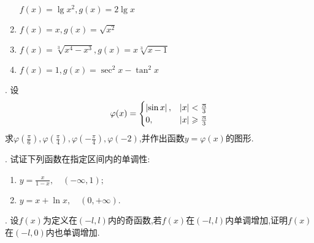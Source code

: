 \begin{task}{}
\begin{enumerate}
    $f(x)=\lg{x^2},g(x)=2\lg{x}$
  \item
    $f(x)=x,g(x)=\sqrt{x^2}$
  \item
    $f(x)=\sqrt[3]{x^{4}-x^{3}},g(x)=x\sqrt[3]{x-1}$
  \item
    $f(x)=1,g(x)=\sec^2{x}-\tan^2{x}$
  \end{enumerate}
  . 设
  \begin{align*}
    \varphi(x)=
    \begin{cases}
      \left|\sin x\right|,&\left|x\right|<\frac{\uppi}{3}\\
      0,&\left|x\right|\geqslant\frac{\uppi}{3}
    \end{cases}
  \end{align*}
  求$\varphi(\frac{\pi}{6}),\varphi(\frac{\pi}{4}),\varphi(-\frac{\pi}{4}),\varphi(-2)$,并作出函数$y=\varphi(x)$的图形.

  . 试证下列函数在指定区间内的单调性:
  \begin{multicols}{2}
    \begin{enumerate}
    \item {}
      $y=\frac{x}{1-x},\quad(-\infty, 1);$
    \item {}
      $y=x+\ln x,\quad(0, +\infty).$
    \end{enumerate}
  \end{multicols}
  . 设$f(x)$为定义在$(-l, l)$内的奇函数,若$f(x)$在$(-l, l)$内单调增加,证明$f(x)$在$(-l, 0)$内也单调增加.


\end{task}

